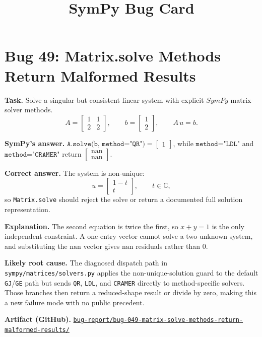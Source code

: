 \documentclass[11pt]{article}
\title{SymPy Bug Card}
\author{}
\date{}
\newcommand{\SymPy}{SymPy}
\newcommand{\artifactrepo}{https://github.com/TODO-org/TODO-repo}
\newcommand{\bugbundle}[1]{\href{\artifactrepo/tree/main/bug-report/#1}{\nolinkurl{bug-report/#1/}}}
\begin{document}
\maketitle

\section*{Bug 49: Matrix.solve Methods Return Malformed Results}

\begin{counterexamplebox}
\textbf{Task.} Solve a singular but consistent linear system with explicit \(\SymPy\) matrix-solver methods.
\[
A=\begin{bmatrix}1&1\\2&2\end{bmatrix},\qquad
b=\begin{bmatrix}1\\2\end{bmatrix},\qquad
A\,u=b .
\]

\medskip
\textbf{SymPy's answer.} \(\texttt{A.solve(b, method="QR")}=\begin{bmatrix}1\end{bmatrix}\), while \(\texttt{method="LDL"}\) and \(\texttt{method="CRAMER"}\) return \(\begin{bmatrix}\mathrm{nan}\\ \mathrm{nan}\end{bmatrix}\).

\medskip
\textbf{Correct answer.} The system is non-unique:
\[
u=\begin{bmatrix}1-t\\ t\end{bmatrix},\qquad t\in\mathbb{C},
\]
so \texttt{Matrix.solve} should reject the solve or return a documented full solution representation.

\medskip
\textbf{Explanation.} The second equation is twice the first, so \(x+y=1\) is the only independent constraint. A one-entry vector cannot solve a two-unknown system, and substituting the \(\mathrm{nan}\) vector gives \(\mathrm{nan}\) residuals rather than \(0\).

\medskip
\textbf{Likely root cause.} The diagnosed dispatch path in \nolinkurl{sympy/matrices/solvers.py} applies the non-unique-solution guard to the default \texttt{GJ}/\texttt{GE} path but sends \texttt{QR}, \texttt{LDL}, and \texttt{CRAMER} directly to method-specific solvers. Those branches then return a reduced-shape result or divide by zero, making this a new failure mode with no public precedent.

\medskip
\textbf{Artifact (GitHub).} \bugbundle{bug-049-matrix-solve-methods-return-malformed-results}
\end{counterexamplebox}
\end{document}
